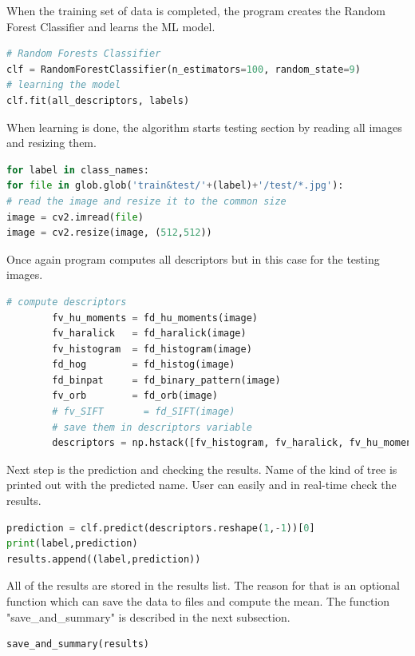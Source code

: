 \documentclass[12pt]{article}
\begin{document}
When the training set of data is completed, the program creates the Random Forest Classifier and learns the ML model.

\begin{lstlisting}[language=Python]
# Random Forests Classifier
clf = RandomForestClassifier(n_estimators=100, random_state=9)
# learning the model
clf.fit(all_descriptors, labels)
\end{lstlisting}

When learning is done, the algorithm starts testing section by reading all images and resizing them.

\begin{lstlisting}[language=Python]
for label in class_names:
for file in glob.glob('train&test/'+(label)+'/test/*.jpg'):
# read the image and resize it to the common size
image = cv2.imread(file)
image = cv2.resize(image, (512,512))
\end{lstlisting}

Once again program computes all descriptors but in this case for the testing images.

\begin{lstlisting}[language=Python]
        # compute descriptors
        fv_hu_moments = fd_hu_moments(image)
        fv_haralick   = fd_haralick(image)
        fv_histogram  = fd_histogram(image)
        fd_hog        = fd_histog(image)
        fd_binpat     = fd_binary_pattern(image)
        fv_orb        = fd_orb(image)
        # fv_SIFT       = fd_SIFT(image)
        # save them in descriptors variable
        descriptors = np.hstack([fv_histogram, fv_haralick, fv_hu_moments, fv_hog, fv_binpat, fv_orb])
\end{lstlisting}

Next step is the prediction and checking the results. Name of the kind of tree is printed out with the predicted name. User can easily and in real-time check the results.

\begin{lstlisting}[language=Python]
prediction = clf.predict(descriptors.reshape(1,-1))[0]
print(label,prediction)
results.append((label,prediction))
\end{lstlisting}

All of the results are stored in the results list. The reason for that is an optional function which can save the data to files and compute the mean.
The function "save\_and\_summary" is described in the next subsection.

\begin{lstlisting}[language=Python]
save_and_summary(results)
\end{lstlisting}
\end{document}
